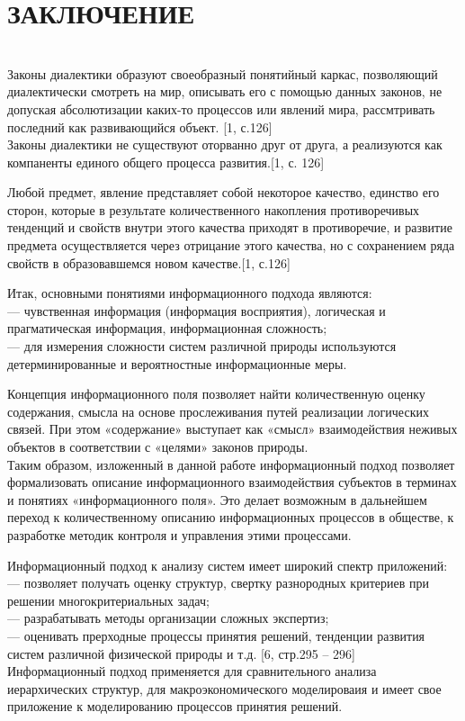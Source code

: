 \documentclass[a4paper,12pt]{report}
\begin{document}
\chapter*{ЗАКЛЮЧЕНИЕ }
 \\
 
Законы диалектики образуют своеобразный понятийный каркас, позволяющий диалектически смотреть на мир, описывать его с помощью данных законов, не допуская абсолютизации каких-то процессов или явлений мира, рассмтривать последний как развивающийся объект. [1, с.126]\\
Законы диалектики не существуют оторванно  друг от друга, а реализуются как компаненты единого общего процесса развития.[1, с. 126]

Любой предмет, явление представляет собой некоторое качество, единство его сторон, которые в результате количественного накопления противоречивых тенденций и свойств внутри этого качества приходят в противоречие, и развитие предмета осуществляется через отрицание этого качества, но с сохранением ряда свойств в образовавшемся новом качестве.[1, с.126]

Итак, основными понятиями информационного подхода являются:\\
\hspace*{0.7cm} — чувственная информация (информация восприятия), логическая и прагматическая информация, информационная сложность;\\
\hspace*{0.7cm} — для измерения сложности систем различной природы используются детерминированные и вероятностные информационные меры.

Концепция информационного поля позволяет найти количественную оценку содержания, смысла на основе прослеживания путей реализации логических связей. При этом «содержание» выступает как «смысл» взаимодействия неживых объектов в соответствии с «целями» законов природы.\\
Таким образом, изложенный в данной работе информационный подход позволяет формализовать описание информационного взаимодействия субъектов в терминах и понятиях «информационного поля». Это делает возможным в дальнейшем переход к количественному описанию информационных процессов в обществе, к разработке методик контроля и управления этими процессами.

 Информационный подход к анализу систем имеет широкий спектр приложений:\\
\hspace*{0.7cm}—  позволяет получать оценку структур, свертку разнородных критериев при решении многокритериальных задач;\\
\hspace*{0.7cm}—  разрабатывать методы организации сложных экспертиз;\\
\hspace*{0.7cm}—  оценивать прерходные процессы принятия решений, тенденции развития систем различной физической природы и т.д. [6, стр.295 – 296]\\ Информационный подход применяется для сравнительного анализа иерархических структур, для макроэкономического моделироваия и  имеет свое приложение к моделированию процессов принятия решений.
\end{document}
